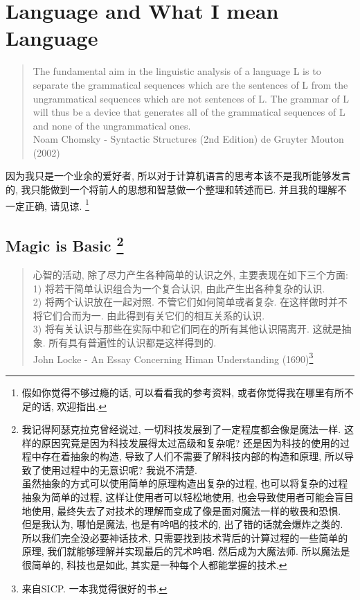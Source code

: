 \chapter{Language and What I mean Language}

\begin{quotation}
  The fundamental aim in the linguistic analysis of a language L is to separate the grammatical sequences which are the sentences of L from the ungrammatical sequences which are not sentences of L. 
  The grammar of L will thus be a device that generates all of the grammatical sequences of L and none of the ungrammatical ones. \\

  Noam Chomsky - Syntactic Structures (2nd Edition) de Gruyter Mouton (2002)
\end{quotation}

因为我只是一个业余的爱好者, 所以对于计算机语言的思考本该不是我所能够发言的, 我只能做到一个将前人的思想和智慧做一个整理和转述而已. 并且我的理解不一定正确, 请见谅. \footnote{假如你觉得不够过瘾的话, 可以看看我的参考资料, 或者你觉得我在哪里有所不足的话, 欢迎指出. }

\section{Magic is Basic \footnote{我记得阿瑟克拉克曾经说过, 一切科技发展到了一定程度都会像是魔法一样. 这样的原因究竟是因为科技发展得太过高级和复杂呢? 还是因为科技的使用的过程中存在着抽象的构造, 导致了人们不需要了解科技内部的构造和原理, 所以导致了使用过程中的无意识呢? 我说不清楚. \\ 虽然抽象的方式可以使用简单的原理构造出复杂的过程, 也可以将复杂的过程抽象为简单的过程, 这样让使用者可以轻松地使用, 也会导致使用者可能会盲目地使用, 最终失去了对技术的理解而变成了像是面对魔法一样的敬畏和恐惧. \\ 但是我认为, 哪怕是魔法, 也是有吟唱的技术的, 出了错的话就会爆炸之类的. 所以我们完全没必要神话技术, 只需要找到技术背后的计算过程的一些简单的原理, 我们就能够理解并实现最后的咒术吟唱. 然后成为大魔法师. 所以魔法是很简单的, 科技也是如此, 其实是一种每个人都能掌握的技术. }}
\begin{quotation}
  心智的活动, 除了尽力产生各种简单的认识之外, 主要表现在如下三个方面: \\
  1) 将若干简单认识组合为一个复合认识, 由此产生出各种复杂的认识. \\
  2) 将两个认识放在一起对照. 不管它们如何简单或者复杂. 在这样做时并不将它们合而为一. 由此得到有关它们的相互关系的认识. \\
  3) 将有关认识与那些在实际中和它们同在的所有其他认识隔离开. 这就是抽象. 所有具有普遍性的认识都是这样得到的. \\

  John Locke - An Essay Concerning Himan Understanding (1690)\footnote{来自SICP. 一本我觉得很好的书. }
\end{quotation}

